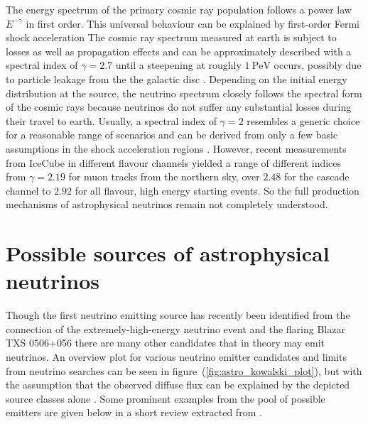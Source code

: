 The energy spectrum of the primary cosmic ray population follows a power law $E^{-\gamma}$ in first order.
This universal behaviour can be explained by first-order Fermi shock acceleration \cite{Malkov:2001tu,Baring:1997ka,BellShockAcc1,BellShockAcc2}
The cosmic ray spectrum measured at earth is subject to losses as well as propagation effects and can be approximately described with a spectral index of $\gamma=\num{2.7}$ until a steepening at roughly $\SI{1}{\peta\eV}$ occurs, possibly due to particle leakage from the the galactic disc \cite{Moskalenko:2003en,Moskalenko:2013galprop,Gaisser:2013bla,Gaisser:2010historic,Hoerandel:2002yg,Grupen:2005rx,Gondolo:1995fq}.
Depending on the initial energy distribution at the source, the neutrino spectrum closely follows the spectral form of the cosmic rays because neutrinos do not suffer any substantial losses during their travel to earth.
Usually, a spectral index of $\gamma=2$ resembles a generic choice for a reasonable range of scenarios and can be derived from only a few basic assumptions in the shock acceleration regions \cite{Lipari:2008zf,BellShockAcc1,Gaisser:1990vg}.
However, recent measurements from IceCube in different flavour channels yielded a range of different indices from $\gamma=\num{2.19}$ \cite{Haack:2017dxi} for muon tracks from the northern sky, over $\num{2.48}$ \cite{Niederhausen:2017mjk} for the cascade channel to $\num{2.92}$ \cite{Kopper:2017zzm} for all flavour, high energy starting events.
So the full production mechanisms of astrophysical neutrinos remain not completely understood.

\section{Possible sources of astrophysical neutrinos}
Though the first neutrino emitting source has recently been identified from the connection of the extremely-high-energy neutrino event and the flaring Blazar TXS 0506+056 \cite{IceCube:2018dnn} there are many other candidates that in theory may emit neutrinos.
An overview plot for various neutrino emitter candidates and limits from neutrino searches can be seen in figure~(\ref{fig:astro_kowalski_plot}), but with the assumption that the observed diffuse flux can be explained by the depicted source classes alone \cite{Kowalski:2014zda}.
Some prominent examples from the pool of possible emitters are given below in a short review extracted from \cite{Grupen:2005rx,Gaisser:2016uoy,Meszaros:2017fcs,Dermer:2016jmw,Dermer:2006xt, Mertsch:2016hcd,Boettcher:2012ssc,Urry:1995mg}.

